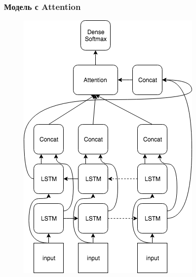 \documentclass[russian]{beamer}
\begin{document}
\begin{frame}
\frametitle{Модель с Attention}

\begin{figure}[H]
	\begin{center}
		\includegraphics[width=0.48\linewidth]{Attention}
	\end{center}
\end{figure}


\end{frame}
\end{document}
